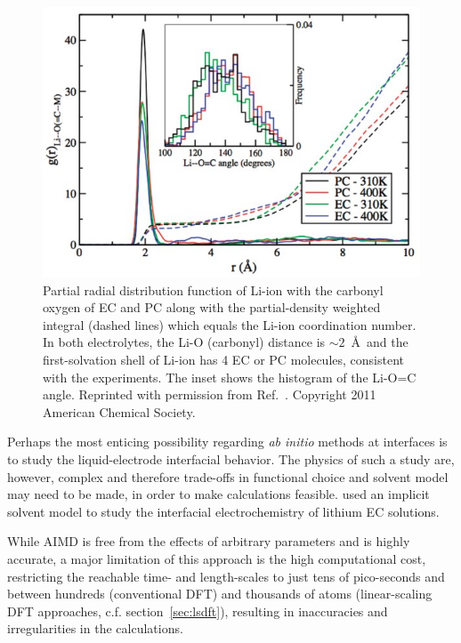 \documentclass[../main.tex]{subfiles}
\begin{document}
\begin{figure}
    \centering
    \includegraphics[scale=0.5]{figures/aimda.jpg}
    \caption{Partial radial distribution function of Li-ion with the carbonyl oxygen of EC and PC along with the partial-density weighted integral (dashed lines) which equals the Li-ion coordination number. In both electrolytes, the Li-O (carbonyl) distance is $\sim2$~\AA \ and the first-solvation shell of Li-ion has 4 EC or PC molecules, consistent with the experiments. The inset shows the histogram of the Li-O=C angle. Reprinted with permission from Ref.~. Copyright 2011 American Chemical Society.}
    \label{fig:leaimda}
\end{figure}

Perhaps the most enticing possibility regarding \textit{ab initio} methods at interfaces is to study the liquid-electrode interfacial behavior. The physics of such a study are, however, complex and therefore trade-offs in functional choice and solvent model may need to be made, in order to make calculations feasible. \citeauthor{lespes2015using} used an implicit solvent model to study the interfacial electrochemistry of lithium EC solutions.\cite{lespes2015using}

While AIMD is free from the effects of arbitrary parameters and is highly accurate, a major limitation of this approach is the high computational cost, restricting the reachable time- and length-scales to just tens of pico-seconds and between hundreds (conventional DFT) and thousands of atoms (linear-scaling DFT approaches, c.f. section~\ref{sec:lsdft}), resulting in inaccuracies and irregularities in the calculations.
\end{document}
